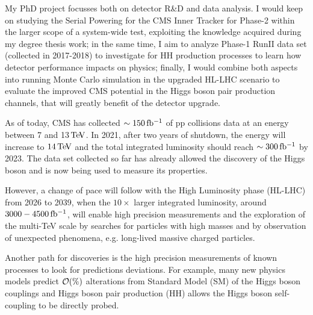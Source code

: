\documentclass[a4paper,11pt,english]{article}
\begin{document}

\pagestyle{plain}
\noindent

\bigskip

 My PhD project focusses both on detector R\&D and data analysis. I would keep on studying the Serial Powering for the CMS Inner Tracker for Phase-2 within the larger scope of a system-wide test, exploiting the knowledge acquired during my degree thesis work; in the same time, I aim to analyze Phase-1 RunII data set (collected in 2017-2018) to investigate for HH production processes to learn how detector performance impacts on physics; finally, I would combine both aspects into running Monte Carlo simulation in the upgraded HL-LHC scenario to evaluate the improved CMS potential in the Higgs boson pair production channels, that will greatly benefit of the detector upgrade.
\bigskip

As of today, CMS has collected $\sim 150{\rm \, fb^{-1}}$ of pp collisions data at an energy between 7 and 13${\rm \, Te\kern-0.125em V}$. In 2021, after two years of shutdown, the energy will increase to $14{\rm \, Te\kern-0.125em V}$ and the total integrated luminosity should reach $\sim 300{\rm \, fb^{-1}}$ by 2023. The data set collected so far has already allowed the discovery of the Higgs boson and is now being used to measure its properties.

However, a change of pace will follow with the High Luminosity phase (HL-LHC) from 2026 to 2039, when the $10\times$ larger integrated luminosity, around  $3000-4500{\rm \, fb^{-1}}$, will enable high precision measurements and the
exploration of the multi-TeV scale by searches for particles with high masses and by observation of unexpected phenomena, e.g. long-lived massive charged particles. %
 
Another path for discoveries is the high precision measurements of known processes to look for predictions deviations. For example, many new physics models predict $\cal{O}(\%)$ alterations from Standard Model (SM) of the Higgs boson couplings and Higgs boson pair production (HH) allows the Higgs boson self-coupling to be directly probed. 
\end{document}
